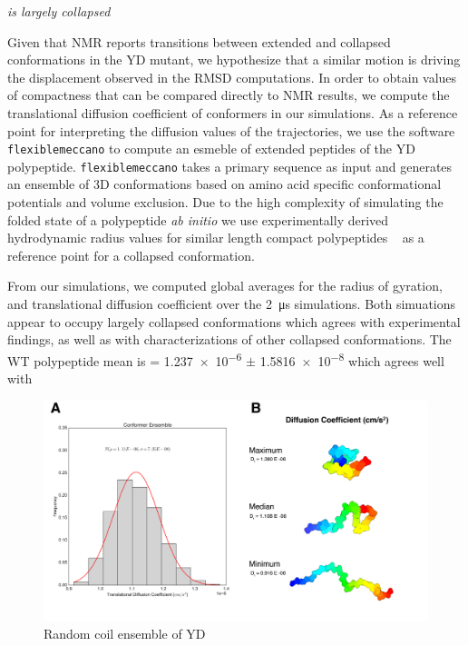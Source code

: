 {\it \gct{} is largely collapsed}

Given that NMR reports transitions between extended and collapsed conformations in the YD mutant, we hypothesize that a similar motion is driving the displacement observed in the RMSD computations. In order to obtain values of compactness that can be compared directly to NMR results, we compute the translational diffusion coefficient of conformers in our simulations. As a reference point for interpreting the diffusion values of the trajectories, we use the software \texttt{flexiblemeccano} to compute an esmeble of extended peptides of the YD polypeptide. \texttt{flexiblemeccano} takes a primary sequence as input and generates an ensemble of 3D conformations based on amino acid specific conformational potentials and volume exclusion.  Due to the high complexity of simulating the folded state of a polypeptide {\it ab initio} we use experimentally derived hydrodynamic radius values for similar length compact polypeptides ~\cite{wilkins1999hydrodynamic} as a reference point for a collapsed conformation.

From our simulations, we computed global averages for the radius of gyration, and translational diffusion coefficient over the \SI{2}{\us} simulations. Both simuations appear to occupy largely collapsed conformations which agrees with experimental findings, as well as with characterizations of other collapsed conformations. The WT polypeptide \diffusion mean is \diffusion = \num{1.237e-6} $\pm$ \SI{1.5816e-8}{\dcunits} which agrees well with  








\begin{figure}
\centering
\includegraphics[height=0.5\textwidth]{figures/FM_dist.png}
\caption{Random coil ensemble of YD \gct{}}
\label{flexiblemeccano}
\end{figure}

